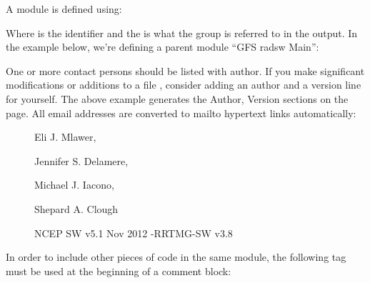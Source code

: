 \documentclass[letterpaper,10pt,english]{sphinxmanual}
\begin{document}
A module is defined using:

\begin{sphinxVerbatim}[commandchars=\\\{\}]
\end{sphinxVerbatim}

Where  is the identifier and the  is what the
group is referred to in the output. In the example below, we’re defining a parent
module “GFS radsw Main”:

\begin{sphinxVerbatim}[commandchars=\\\{\}]
\end{sphinxVerbatim}

One or more contact persons should be listed with author. If you make
significant modifications or additions to a file , consider adding an
author and a version line for yourself. The above example generates
the Author, Version sections on the page. All email addresses are converted
to mailto hypertext links automatically:
\begin{description}
\item[{}] \leavevmode
Eli J. Mlawer, 

Jennifer S. Delamere, 

Michael J. Iacono, 

Shepard A. Clough

\item[{}] \leavevmode
NCEP SW v5.1  Nov 2012 -RRTMG-SW v3.8

\end{description}

In order to include other pieces of code in the same module, the following
tag must be used at the beginning of a comment block:
\end{document}
